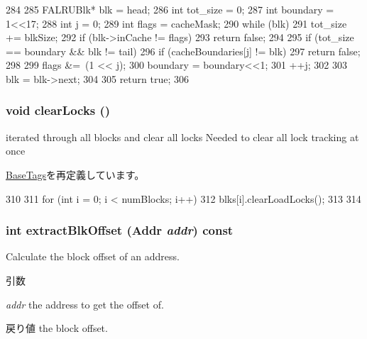 \begin{DoxyCode}
284 {
285     FALRUBlk* blk = head;
286     int tot_size = 0;
287     int boundary = 1<<17;
288     int j = 0;
289     int flags = cacheMask;
290     while (blk) {
291         tot_size += blkSize;
292         if (blk->inCache != flags) {
293             return false;
294         }
295         if (tot_size == boundary && blk != tail) {
296             if (cacheBoundaries[j] != blk) {
297                 return false;
298             }
299             flags &=~(1 << j);
300             boundary = boundary<<1;
301             ++j;
302         }
303         blk = blk->next;
304     }
305     return true;
306 }
\end{DoxyCode}
\hypertarget{classFALRU_a522e7dda9c2f4eba2cc1c103887d9265}{
\subsubsection[{clearLocks}]{\setlength{\rightskip}{0pt plus 5cm}void clearLocks ()}}
\label{classFALRU_a522e7dda9c2f4eba2cc1c103887d9265}
iterated through all blocks and clear all locks Needed to clear all lock tracking at once 

\hyperlink{classBaseTags_a9f3e3b80f263780be72db8b9dc53680e}{BaseTags}を再定義しています。


\begin{DoxyCode}
310 {
311     for (int i = 0; i < numBlocks; i++){
312         blks[i].clearLoadLocks();
313     }
314 }
\end{DoxyCode}
\hypertarget{classFALRU_aca82d98193a0685a9648acf6127abb1c}{
\subsubsection[{extractBlkOffset}]{\setlength{\rightskip}{0pt plus 5cm}int extractBlkOffset ({\bf Addr} {\em addr}) const}}
\label{classFALRU_aca82d98193a0685a9648acf6127abb1c}
Calculate the block offset of an address. 
\begin{DoxyParams}{引数}
\item[{\em addr}]the address to get the offset of. \end{DoxyParams}
\begin{DoxyReturn}{戻り値}
the block offset. 
\end{DoxyReturn}



